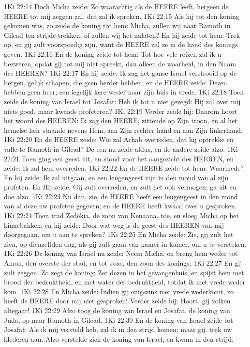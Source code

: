 1Ki 22:14  Doch Micha zeide: Zo waarachtig als de HEERE leeft, hetgeen de HEERE tot mij zeggen zal, dat zal ik spreken.
1Ki 22:15  Als hij tot den koning gekomen was, zo zeide de koning tot hem: Micha, zullen wij naar Ramoth in Gilead ten strijde trekken, of zullen wij het nalaten? En hij zeide tot hem: Trek op, en gij zult voorspoedig zijn, want de HEERE zal ze in de hand des konings geven.
1Ki 22:16  En de koning zeide tot hem: Tot hoe vele reizen zal ik u bezweren, opdat gij tot mij niet spreekt, dan alleen de waarheid, in den Naam des HEEREN?
1Ki 22:17  En hij zeide: Ik zag het ganse Israel verstrooid op de bergen, gelijk schapen, die geen herder hebben; en de HEERE zeide: Dezen hebben geen heer; een iegelijk kere weder naar zijn huis in vrede.
1Ki 22:18  Toen zeide de koning van Israel tot Josafat: Heb ik tot u niet gezegd: Hij zal over mij niets goed, maar kwaads profeteren?
1Ki 22:19  Verder zeide hij: Daarom hoort het woord des HEEREN: Ik zag den HEERE, zittende op Zijn troon, en al het hemelse heir staande nevens Hem, aan Zijn rechter hand en aan Zijn linkerhand.
1Ki 22:20  En de HEERE zeide: Wie zal Achab overreden, dat hij optrekke en valle te Ramoth in Gilead? De een nu zeide aldus, en de andere zeide alzo.
1Ki 22:21  Toen ging een geest uit, en stond voor het aangezicht des HEEREN, en zeide: Ik zal hem overreden.
1Ki 22:22  En de HEERE zeide tot hem: Waarmede? En hij zeide: Ik zal uitgaan, en een leugengeest zijn in den mond van al zijn profeten. En Hij zeide: Gij zult overreden, en zult het ook vermogen; ga uit en doe alzo.
1Ki 22:23  Nu dan, zie, de HEERE heeft een leugengeest in den mond van al deze uw profeten gegeven; en de HEERE heeft kwaad over u gesproken.
1Ki 22:24  Toen trad Zedekia, de zoon van Kenaana, toe, en sloeg Micha op het kinnebakken; en hij zeide: Door wat weg is de geest des HEEREN van mij doorgegaan, om u aan te spreken?
1Ki 22:25  En Micha zeide: Zie, gij zult het zien, op dienzelfden dag, als gij zult gaan van kamer in kamer, om u te versteken.
1Ki 22:26  De koning van Israel nu zeide: Neem Micha, en breng hem weder tot Amon, den overste der stad, en tot Joas, den zoon des konings;
1Ki 22:27  En gij zult zeggen: Zo zegt de koning: Zet dezen in het gevangenhuis, en spijst hem met brood der bedruktheid, en met water der bedruktheid, totdat ik met vrede weder kom.
1Ki 22:28  En Micha zeide: Indien gij enigszins met vrede wederkomt, zo heeft de HEERE door mij niet gesproken! Verder zeide hij: Hoort, gij volken altegaar!
1Ki 22:29  Alzo toog de koning van Israel en Josafat, de koning van Juda, op naar Ramoth in Gilead.
1Ki 22:30  En de koning van Israel zeide tot Josafat: Als ik mij versteld heb, zal ik in den strijd komen; maar gij, trek uw klederen aan. Alzo verstelde zich de koning van Israel, en kwam in den strijd.
